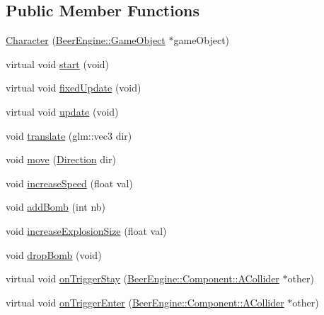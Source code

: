 \subsection*{Public Member Functions}
\begin{DoxyCompactItemize}
\item 
\mbox{\hyperlink{class_game_1_1_component_1_1_character_a70cf2d6b5b9f398cfc9c5c87d1494851}{Character}} (\mbox{\hyperlink{class_beer_engine_1_1_game_object}{Beer\+Engine\+::\+Game\+Object}} $\ast$game\+Object)
\item 
virtual void \mbox{\hyperlink{class_game_1_1_component_1_1_character_ab5ffa080b89ab20becf30a27a881d4d4}{start}} (void)
\item 
virtual void \mbox{\hyperlink{class_game_1_1_component_1_1_character_a19848759fb1837ca8dfeb2f10266fe9d}{fixed\+Update}} (void)
\item 
virtual void \mbox{\hyperlink{class_game_1_1_component_1_1_character_ae8fe4181d3161364df101404589b8565}{update}} (void)
\item 
void \mbox{\hyperlink{class_game_1_1_component_1_1_character_a1c5583b4e0fa4c9a38810e67dd247371}{translate}} (glm\+::vec3 dir)
\item 
void \mbox{\hyperlink{class_game_1_1_component_1_1_character_aa5b5758f8c232ac08ebbccf2cfb05142}{move}} (\mbox{\hyperlink{class_game_1_1_component_1_1_character_aa1b80f780538b76c7a948e96c54dbe87}{Direction}} dir)
\item 
void \mbox{\hyperlink{class_game_1_1_component_1_1_character_a08f5931447cfebc885c06daa6d666da1}{increase\+Speed}} (float val)
\item 
void \mbox{\hyperlink{class_game_1_1_component_1_1_character_a5ad868c929bdcd0aa6e12eff783500cc}{add\+Bomb}} (int nb)
\item 
void \mbox{\hyperlink{class_game_1_1_component_1_1_character_ae65f3f38e0efa49a21374e0e6b9dd5c7}{increase\+Explosion\+Size}} (float val)
\item 
void \mbox{\hyperlink{class_game_1_1_component_1_1_character_ac2cbd714fb3d9e4fccae9b026dbcd3e5}{drop\+Bomb}} (void)
\item 
virtual void \mbox{\hyperlink{class_game_1_1_component_1_1_character_ab0ac4d77a9403cded5c52d77121a625c}{on\+Trigger\+Stay}} (\mbox{\hyperlink{class_beer_engine_1_1_component_1_1_a_collider}{Beer\+Engine\+::\+Component\+::\+A\+Collider}} $\ast$other)
\item 
virtual void \mbox{\hyperlink{class_game_1_1_component_1_1_character_a69ff22151cf9599aab5cbe6929505c8e}{on\+Trigger\+Enter}} (\mbox{\hyperlink{class_beer_engine_1_1_component_1_1_a_collider}{Beer\+Engine\+::\+Component\+::\+A\+Collider}} $\ast$other)

\end{DoxyCompactItemize}
